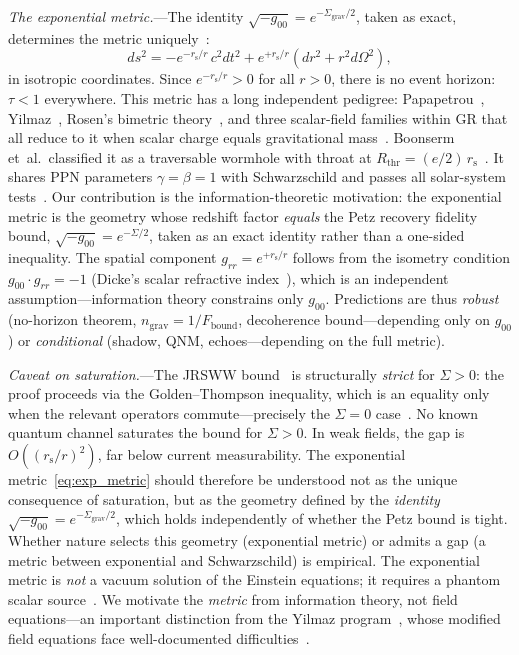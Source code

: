 \documentclass[prl,twocolumn,superscriptaddress,floatfix,nofootinbib]{revtex4-2}
\newcommand{\tauasym}{\tau}
\newcommand{\rs}{r_{\mathrm{s}}}
\newcommand{\Sgrav}{\Sigma_{\mathrm{grav}}}
\newcommand{\Fbound}{F_{\mathrm{bound}}}
\newcommand{\nref}{n_{\mathrm{grav}}}
\begin{document}
\emph{The exponential metric.}---The identity
$\sqrt{-g_{00}} = e^{-\Sgrav/2}$, taken as
exact, determines the metric
uniquely~\cite{Papapetrou1954,Yilmaz1958}:
\begin{equation}
  ds^2 = -e^{-\rs/r}\, c^2 dt^2
       + e^{+\rs/r}\!\left(dr^2 + r^2 d\Omega^2\right),
  \label{eq:exp_metric}
\end{equation}
in isotropic coordinates.
Since $e^{-\rs/r} > 0$ for all $r > 0$, there is no
event horizon: $\tauasym < 1$ everywhere.
This metric has a long independent pedigree:
Papapetrou~\cite{Papapetrou1954},
Yilmaz~\cite{Yilmaz1958},
Rosen's bimetric theory~\cite{Rosen1973},
and three scalar-field families within GR that all
reduce to it when scalar charge equals gravitational
mass~\cite{Makukov2020}.
Boonserm et~al.\ classified it as a traversable
wormhole with throat at
$R_{\text{thr}} = (e/2)\,\rs$~\cite{Boonserm2018}.
It shares PPN parameters $\gamma = \beta = 1$ with
Schwarzschild and passes all solar-system
tests~\cite{Bertotti2003}.
Our contribution is the information-theoretic motivation:
the exponential metric is the geometry whose redshift factor
\emph{equals} the Petz recovery fidelity bound, $\sqrt{-g_{00}} = e^{-\Sigma/2}$,
taken as an exact identity rather than a one-sided inequality.
The spatial component $g_{rr} = e^{+\rs/r}$ follows from the
isometry condition $g_{00}\cdot g_{rr} = -1$ (Dicke's scalar
refractive index~\cite{Dicke1957}), which is an independent
assumption---information theory constrains only $g_{00}$.
Predictions are thus \emph{robust} (no-horizon theorem,
$\nref = 1/\Fbound$, decoherence bound---depending only on
$g_{00}$) or \emph{conditional} (shadow, QNM, echoes---depending
on the full metric).

\emph{Caveat on saturation.}---The JRSWW
bound~\cite{JRSWW2018} is structurally \emph{strict} for
$\Sigma > 0$: the proof proceeds via the Golden--Thompson
inequality, which is an equality only when the relevant
operators commute---precisely the $\Sigma = 0$
case~\cite{Petz1988}.
No known quantum channel saturates the bound for
$\Sigma > 0$.
In weak fields, the gap is $O((\rs/r)^2)$, far below
current measurability.
The exponential metric~\eqref{eq:exp_metric} should
therefore be understood not as the unique consequence of
saturation, but as the geometry defined by the
\emph{identity} $\sqrt{-g_{00}} = e^{-\Sgrav/2}$, which
holds independently of whether the Petz bound is tight.
Whether nature selects this geometry (exponential metric)
or admits a gap (a metric between exponential and
Schwarzschild) is empirical.
The exponential metric is \emph{not} a vacuum solution of
the Einstein equations; it requires a phantom scalar
source~\cite{Makukov2020,Boonserm2018}.
We motivate the \emph{metric} from information theory,
not field equations---an important distinction from
the Yilmaz program~\cite{Yilmaz1958},
whose modified field equations face well-documented
difficulties~\cite{Misner1995}.
\end{document}
